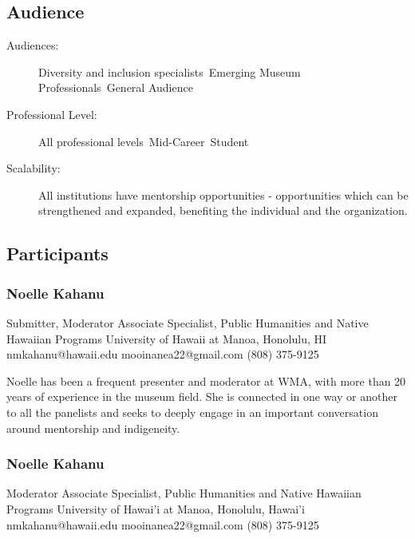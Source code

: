 \documentclass{report}
\begin{document}
              \subsection*{Audience}
                \begin{description}
                  \item [Audiences:]Diversity and inclusion specialists~Emerging Museum Professionals~General Audience~
                  \item[Professional Level:]All professional levels~Mid-Career~Student~
                \item[Scalability:] All institutions have mentorship opportunities - opportunities which can be strengthened and expanded, benefiting the individual and the organization.

							
              \end{description}
            \subsection*{Participants}
              \subsubsection*{ Noelle Kahanu }
              Submitter, Moderator\newline
              Associate Specialist, Public Humanities and Native Hawaiian Programs\newline
              University of Hawaii at Manoa, Honolulu, HI
              \newline
              nmkahanu@hawaii.edu\newline
              mooinanea22@gmail.com\newline
              (808) 375-9125\newline

              Noelle has been a frequent presenter and moderator at WMA, with more than 20 years of experience in the museum field. She is connected in one way or another to all the panelists and seeks to deeply engage in an important conversation around mentorship and indigeneity.\newline


              
                \subsubsection*{ Noelle Kahanu }
                Moderator\newline
                Associate Specialist, Public Humanities and Native Hawaiian Programs\newline
                University of Hawai'i at Manoa, Honolulu, Hawai'i
                \newline
                nmkahanu@hawaii.edu\newline
                mooinanea22@gmail.com\newline
                (808) 375-9125\newline
\end{document}
